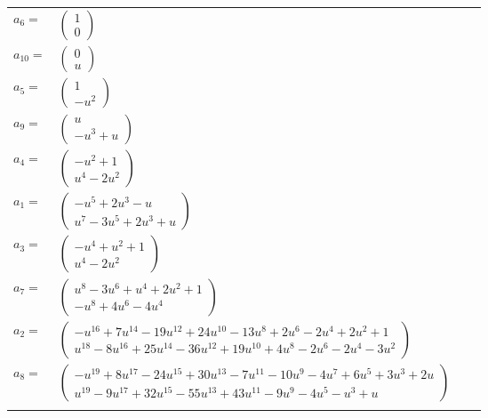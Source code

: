 \documentclass[1p]{elsarticle_modified}
\theoremstyle{definition}
\begin{document}
\begin{tabular}{m{7pt} m{180pt} m{7pt} m{180pt} }
\flushright $a_{6}=$&$\begin{pmatrix}1\\0\end{pmatrix}$ \\
\flushright $a_{10}=$&$\begin{pmatrix}0\\u\end{pmatrix}$ \\
\flushright $a_{5}=$&$\begin{pmatrix}1\\- u^2\end{pmatrix}$ \\
\flushright $a_{9}=$&$\begin{pmatrix}u\\- u^3+u\end{pmatrix}$ \\
\flushright $a_{4}=$&$\begin{pmatrix}- u^2+1\\u^4-2 u^2\end{pmatrix}$ \\
\flushright $a_{1}=$&$\begin{pmatrix}- u^5+2 u^3- u\\u^7-3 u^5+2 u^3+u\end{pmatrix}$ \\
\flushright $a_{3}=$&$\begin{pmatrix}- u^4+u^2+1\\u^4-2 u^2\end{pmatrix}$ \\
\flushright $a_{7}=$&$\begin{pmatrix}u^8-3 u^6+u^4+2 u^2+1\\- u^8+4 u^6-4 u^4\end{pmatrix}$ \\
\flushright $a_{2}=$&$\begin{pmatrix}- u^{16}+7 u^{14}-19 u^{12}+24 u^{10}-13 u^8+2 u^6-2 u^4+2 u^2+1\\u^{18}-8 u^{16}+25 u^{14}-36 u^{12}+19 u^{10}+4 u^8-2 u^6-2 u^4-3 u^2\end{pmatrix}$ \\
\flushright $a_{8}=$&$\begin{pmatrix}- u^{19}+8 u^{17}-24 u^{15}+30 u^{13}-7 u^{11}-10 u^9-4 u^7+6 u^5+3 u^3+2 u\\u^{19}-9 u^{17}+32 u^{15}-55 u^{13}+43 u^{11}-9 u^9-4 u^5- u^3+u\end{pmatrix}$\\&\end{tabular}
\end{document}
